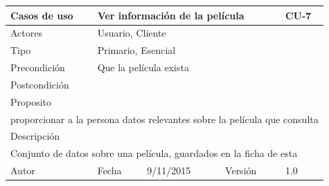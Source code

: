 \documentclass{article}
\begin{document}
\begin{table}[h]
\begin{tabular}{|l|l|l|l|l|l|}
\hline
\multicolumn{2}{|p{2cm}|}{Casos de uso}  & \multicolumn{3}{p{7cm}|}{Ver información de la película} & CU-7 \\
\hline
\multicolumn{2}{|p{2cm}|}{Actores}       & \multicolumn{4}{p{8cm}|}{Usuario, Cliente}        \\
\hline
\multicolumn{2}{|p{2cm}|}{Tipo}          & \multicolumn{4}{p{8cm}|}{Primario, Esencial}        \\
\hline
\multicolumn{2}{|p{2cm}|}{Precondición}  & \multicolumn{4}{p{8cm}|}{Que la película exista}        \\
\hline
\multicolumn{2}{|p{2cm}|}{Postcondición} & \multicolumn{4}{p{8cm}|}{}        \\
\hline
\multicolumn{6}{|p{10cm}|}{Proposito}                                   \\
\hline
\multicolumn{6}{|p{10cm}|}{proporcionar a la persona datos relevantes sobre la película que consulta}                                            \\
\hline
\multicolumn{6}{|p{10cm}|}{Descripción}                                 \\
\hline
\multicolumn{6}{|p{10cm}|}{Conjunto de datos sobre una película, guardados en la ficha de esta }                                            \\
\hline
Autor              &              & Fecha    & 9/11/2015    &   Versión  &1.0\\
\hline
\end{tabular}
\end{table}
\end{document}
